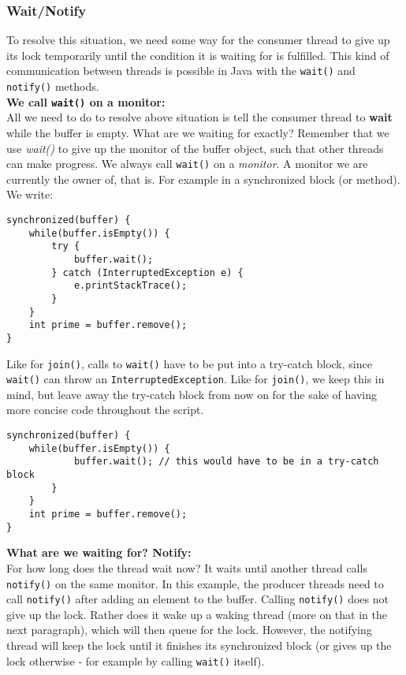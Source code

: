 \documentclass[main.tex]{subfiles}
\begin{document}
\subsubsection{Wait/Notify}
To resolve this situation, we need some way for the consumer thread to give up its lock temporarily until the condition it is waiting for is fulfilled. This kind of communication between threads is possible in Java with the \texttt{wait()} and \texttt{notify()} methods.\\[3mm]
\textbf{We call \texttt{wait()} on a monitor:}\\
All we need to do to resolve above situation is tell the consumer thread to \textbf{wait} while the buffer is empty. What are we waiting for exactly? Remember that we use \textit{wait()} to give up the monitor of the buffer object, such that other threads can make progress. We always call \texttt{wait()} on a \textit{monitor}. A monitor we are currently the owner of, that is. For example in a synchronized block (or method). We write:
\begin{verbatim}
synchronized(buffer) {
    while(buffer.isEmpty()) {
        try {
            buffer.wait();
        } catch (InterruptedException e) {
            e.printStackTrace();
        }
    }
    int prime = buffer.remove();
}
\end{verbatim}
Like for \texttt{join()}, calls to \texttt{wait()} have to be put into a try-catch block, since \texttt{wait()} can throw an \texttt{InterruptedException}. Like for \texttt{join()}, we keep this in mind, but leave away the try-catch block from now on for the sake of having more concise code throughout the script.
\begin{verbatim}
synchronized(buffer) {
    while(buffer.isEmpty()) {
            buffer.wait(); // this would have to be in a try-catch block
        }
    }
    int prime = buffer.remove();
}
\end{verbatim}
\textbf{What are we waiting for? Notify:}\\
For how long does the thread wait now? It waits until another thread calls \texttt{notify()} on the same monitor. In this example, the producer threads need to call \texttt{notify()} after adding an element to the buffer. Calling \texttt{notify()} does not give up the lock. Rather does it wake up a waking thread (more on that in the next paragraph), which will then queue for the lock. However, the notifying thread will keep the lock until it finishes its synchronized block (or gives up the lock otherwise - for example by calling \texttt{wait()} itself).\\
\end{document}
